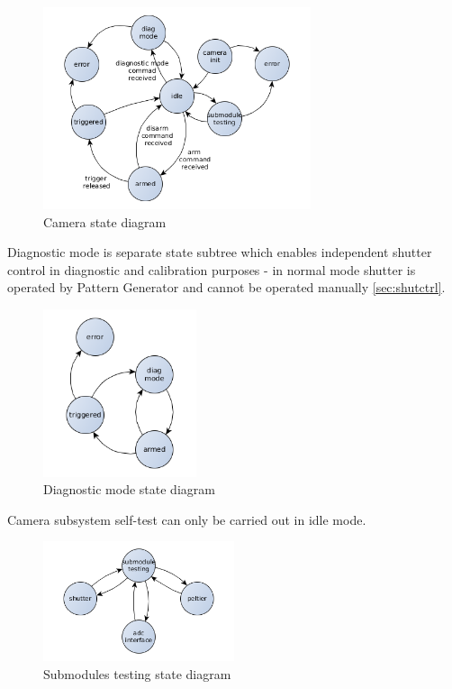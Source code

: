 \begin{figure}[H]
\centering
\includegraphics[width=0.7\textwidth]{pict_ipc/camera_command.png}
\caption{Camera state diagram}
\label{fig:camstate}
\end{figure}

Diagnostic mode is separate state subtree which enables independent shutter control in diagnostic and calibration purposes - in normal mode shutter is operated by Pattern Generator and cannot be operated manually \ref{sec:shutctrl}.

\begin{figure}[H]
\centering
\includegraphics[width=0.4\textwidth]{pict_ipc/diagnostic_mode.png}
\caption{Diagnostic mode state diagram}
\label{fig:camstatediag}
\end{figure}

Camera subsystem self-test can only be carried out in idle mode.

\begin{figure}[H]
\centering
\includegraphics[width=0.5\textwidth]{pict_ipc/testing_mode.png}
\caption{Submodules testing state diagram}
\label{fig:camstatetesting}
\end{figure}
 
